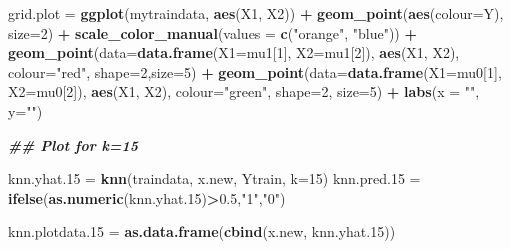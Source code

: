 \documentclass[
]{book}
\newenvironment{Shaded}{\begin{snugshade}}{\end{snugshade}}
\newcommand{\AttributeTok}[1]{\textcolor[rgb]{0.13,0.29,0.53}{#1}}
\newcommand{\DecValTok}[1]{\textcolor[rgb]{0.00,0.00,0.81}{#1}}
\newcommand{\DocumentationTok}[1]{\textcolor[rgb]{0.56,0.35,0.01}{\textbf{\textit{#1}}}}
\newcommand{\FloatTok}[1]{\textcolor[rgb]{0.00,0.00,0.81}{#1}}
\newcommand{\FunctionTok}[1]{\textcolor[rgb]{0.13,0.29,0.53}{\textbf{#1}}}
\newcommand{\NormalTok}[1]{#1}
\newcommand{\OtherTok}[1]{\textcolor[rgb]{0.56,0.35,0.01}{#1}}
\newcommand{\SpecialCharTok}[1]{\textcolor[rgb]{0.81,0.36,0.00}{\textbf{#1}}}
\newcommand{\StringTok}[1]{\textcolor[rgb]{0.31,0.60,0.02}{#1}}
\begin{document}
\begin{Shaded}
\begin{Highlighting}[]
\NormalTok{grid.plot }\OtherTok{=}  \FunctionTok{ggplot}\NormalTok{(mytraindata, }\FunctionTok{aes}\NormalTok{(X1, X2)) }\SpecialCharTok{+}
            \FunctionTok{geom\_point}\NormalTok{(}\FunctionTok{aes}\NormalTok{(}\AttributeTok{colour=}\NormalTok{Y), }\AttributeTok{size=}\DecValTok{2}\NormalTok{) }\SpecialCharTok{+} 
            \FunctionTok{scale\_color\_manual}\NormalTok{(}\AttributeTok{values =} \FunctionTok{c}\NormalTok{(}\StringTok{"orange"}\NormalTok{, }\StringTok{"blue"}\NormalTok{))   }\SpecialCharTok{+}
            \FunctionTok{geom\_point}\NormalTok{(}\AttributeTok{data=}\FunctionTok{data.frame}\NormalTok{(}\AttributeTok{X1=}\NormalTok{mu1[}\DecValTok{1}\NormalTok{], }\AttributeTok{X2=}\NormalTok{mu1[}\DecValTok{2}\NormalTok{]), }\FunctionTok{aes}\NormalTok{(X1, X2), }\AttributeTok{colour=}\StringTok{"red"}\NormalTok{, }\AttributeTok{shape=}\DecValTok{2}\NormalTok{,}\AttributeTok{size=}\DecValTok{5}\NormalTok{) }\SpecialCharTok{+}
            \FunctionTok{geom\_point}\NormalTok{(}\AttributeTok{data=}\FunctionTok{data.frame}\NormalTok{(}\AttributeTok{X1=}\NormalTok{mu0[}\DecValTok{1}\NormalTok{], }\AttributeTok{X2=}\NormalTok{mu0[}\DecValTok{2}\NormalTok{]), }\FunctionTok{aes}\NormalTok{(X1, X2), }\AttributeTok{colour=}\StringTok{"green"}\NormalTok{, }\AttributeTok{shape=}\DecValTok{2}\NormalTok{, }\AttributeTok{size=}\DecValTok{5}\NormalTok{) }\SpecialCharTok{+}
            \FunctionTok{labs}\NormalTok{(}\AttributeTok{x =} \StringTok{""}\NormalTok{, }\AttributeTok{y=}\StringTok{""}\NormalTok{)}


\DocumentationTok{\#\# Plot for k=15}

\NormalTok{knn.yhat}\FloatTok{.15} \OtherTok{=} \FunctionTok{knn}\NormalTok{(traindata, x.new, Ytrain,  }\AttributeTok{k=}\DecValTok{15}\NormalTok{) }
\NormalTok{knn.pred}\FloatTok{.15} \OtherTok{=} \FunctionTok{ifelse}\NormalTok{(}\FunctionTok{as.numeric}\NormalTok{(knn.yhat}\FloatTok{.15}\NormalTok{)}\SpecialCharTok{\textgreater{}}\FloatTok{0.5}\NormalTok{,}\StringTok{"1"}\NormalTok{,}\StringTok{"0"}\NormalTok{)}

\NormalTok{knn.plotdata}\FloatTok{.15} \OtherTok{=} \FunctionTok{as.data.frame}\NormalTok{(}\FunctionTok{cbind}\NormalTok{(x.new, knn.yhat}\FloatTok{.15}\NormalTok{))}



\end{Highlighting}
\end{Shaded}
\end{document}
